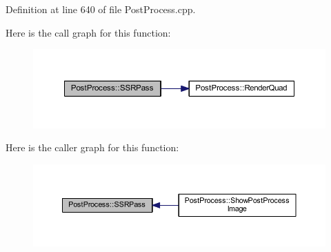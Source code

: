 Definition at line 640 of file Post\+Process.\+cpp.



Here is the call graph for this function\+:
\nopagebreak
\begin{figure}[H]
\begin{center}
\leavevmode
\includegraphics[width=350pt]{class_post_process_aa7f1380b9b6a59b264bd305935547a81_cgraph}
\end{center}
\end{figure}




Here is the caller graph for this function\+:
\nopagebreak
\begin{figure}[H]
\begin{center}
\leavevmode
\includegraphics[width=350pt]{class_post_process_aa7f1380b9b6a59b264bd305935547a81_icgraph}
\end{center}
\end{figure}


